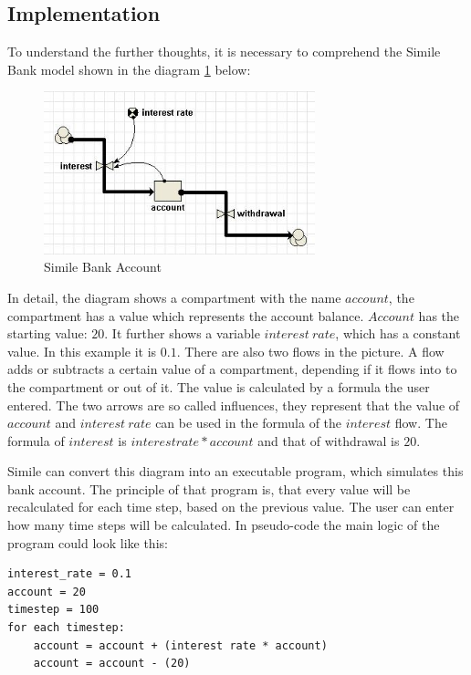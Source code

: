 \subsection{Implementation}
\par
To understand the further thoughts, it is necessary to comprehend the Simile Bank model shown in the diagram \ref{fig:simile_bank_account} below:
\begin{figure}[h]
	\centering
	\includegraphics[width=0.7\textwidth]{pics/generation_of_a_dsl/similie_bank_account.png}
	\caption{Simile Bank Account \label{fig:simile_bank_account}}	
\end{figure}
\par
In detail, the diagram shows a compartment with the name $account$, the compartment has a value which represents the account balance. $Account$ has the starting value: $20$. It further shows a variable $interest\:rate$, which has a constant value. In this example it is $0.1$. There are also two flows in the picture. A flow adds or subtracts a certain value of a compartment, depending if it flows into to the compartment or out of it. The value is calculated by a formula the user entered. The two arrows are so called influences, they represent that the value of $account$ and $interest\:rate$ can be used in the formula of the $interest$ flow. The formula of $interest$ is $interest rate * account$ and that of withdrawal is $20$.
\par
Simile can convert this diagram into an executable program, which simulates this bank account. The principle of that program is, that every value will be recalculated for each time step, based on the previous value. The user can enter how many time steps will be calculated. In pseudo-code the main logic of the program could look like this:
\begin{lstlisting}[language=pseudo]
interest_rate = 0.1
account = 20
timestep = 100
for each timestep:
	account = account + (interest rate * account)
	account = account - (20)
\end{lstlisting}
